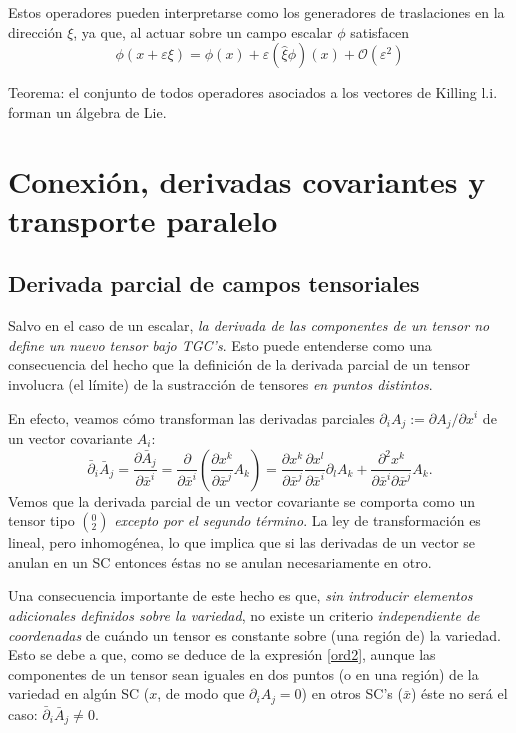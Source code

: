 Estos operadores pueden interpretarse como los generadores de traslaciones en la dirección $\xi$, ya que, al actuar sobre un campo escalar $\phi$ satisfacen
\begin{equation}
\phi(x+\varepsilon\xi) = \phi(x) + \varepsilon(\hat{\xi}\phi)(x) + \mathcal{O}(\varepsilon^2)
\end{equation}

Teorema: el conjunto de todos operadores asociados a los vectores de Killing l.i. forman un álgebra de Lie.

\section{Conexión, derivadas covariantes y transporte paralelo}

\subsection{Derivada parcial de campos tensoriales}

Salvo en el caso de un escalar, \textit{la derivada de las componentes de un tensor no define un nuevo tensor bajo TGC's}. Esto puede entenderse como una consecuencia del hecho que la definición de la derivada parcial de un tensor involucra (el límite) de la sustracción de tensores \textit{en puntos distintos}.

En efecto, veamos cómo transforman las derivadas parciales $\partial_i
A_j:={\partial A_j}/{\partial x^i}$ de un vector covariante $A_i$:
\begin{equation}
\bar{\partial}_i\bar{A}_j=\frac{\partial \bar{A}_j}{\partial
\bar{x}^i}=\frac{\partial}{\partial \bar{x}^i}\left(\frac{\partial x^k
}{\partial\bar{x}^j}A_k \right)
=\frac{\partial x^k}{\partial\bar{x}^j}\frac{\partial x^l}{\partial\bar{x}^i}
\partial_l A_k +\frac{\partial^2 x^k}{\partial\bar
{x}^i \partial\bar{x}^j}A_k . \label{ord2}
\end{equation}
Vemos que la derivada parcial de un vector covariante se comporta como un tensor tipo $(_2^0)$ \textit{excepto por el segundo término}. La ley de
transformación es lineal, pero inhomogénea, lo que implica que si las
derivadas de un vector se anulan en un SC entonces éstas no se anulan
necesariamente en otro.

Una consecuencia importante de este hecho es que, \textit{sin introducir elementos adicionales definidos sobre la variedad}, no existe un criterio \textit{independiente de coordenadas} de cuándo un tensor es constante sobre (una región de) la variedad. Esto se debe a que, como se deduce de la expresión \eqref{ord2}, aunque las componentes de un tensor sean iguales en dos puntos (o en una región) de la variedad en algún SC ($x$, de modo que $\partial_iA_j=0$) en otros SC's ($\bar{x}$) éste no será el caso: $\bar{\partial}_i\bar{A}_j\neq 0$.
 
